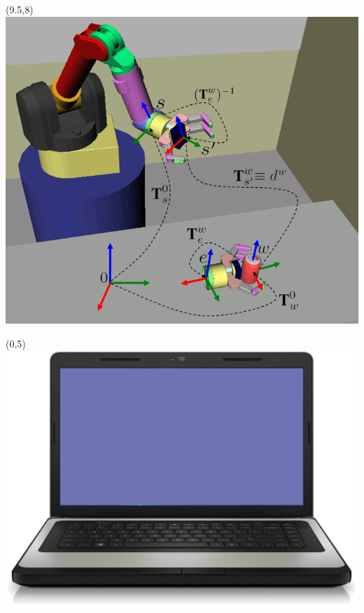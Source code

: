 \documentclass{beamer}
\begin{document}
\begin{frame}[plain]{}
\begin{textblock}{5}
            \end{textblock}  
                \begin{textblock}{5}(9.5,8)
                    \includegraphics[width=1.2\linewidth]{figures/pick_and_place.png}
                  \end{textblock}                      
          \begin{textblock}{5}(0,5)
              \includegraphics[width=0.6\linewidth]{figures/laptop.png}
            \end{textblock} 
        \end{frame}  
\end{document}

